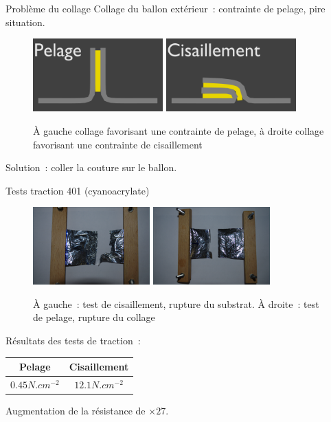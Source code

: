 \begin{frame}{Problème du collage}
  Collage du ballon extérieur~: contrainte de pelage, pire situation.
  \begin{figure}
    \centering
    \includegraphics[width=5cm]{../Images/colle_pelage.png}
    \includegraphics[width=5cm]{../Images/colle_cisaillement.png}
    \caption{À gauche collage favorisant une contrainte de pelage, à droite collage favorisant une contrainte de cisaillement}
  \end{figure}
  Solution~: coller la couture sur le ballon.
\end{frame}

\begin{frame}{Tests traction 401 (cyanoacrylate)}
  \begin{figure}[!t]
    \centering
    \includegraphics[width=4.5cm]{../Images/test_cisaillement.png}
    \includegraphics[width=4.5cm]{../Images/test_pelage.png}
    
    \caption{À gauche~: test de cisaillement, rupture du substrat. À droite~: test de pelage, rupture du collage}
  \end{figure}
  Résultats des tests de traction~:
  \begin{center}
    \begin{tabular}{|c|c|}
      \hline
      Pelage & Cisaillement \\
      \hline
      $0.45 N.cm^{-2}$ & $12.1 N.cm^{-2}$ \\
      \hline
    \end{tabular}
  \end{center}
  Augmentation de la résistance de $\times 27$.
\end{frame}


